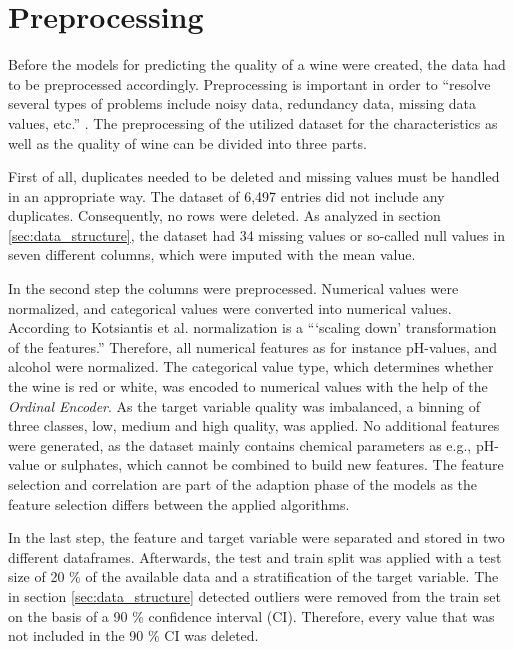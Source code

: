 \section{Preprocessing}\label{chap:preprocessing}
Before the models for predicting the quality of a wine were created, the data had to be preprocessed accordingly. Preprocessing is important in order to \enquote{resolve several types of problems include noisy data, redundancy data, missing data values, etc.} \citep[p. 116]{Kotsiantis2006}. The preprocessing of the utilized dataset for the characteristics as well as the quality of wine can be divided into three parts.

First of all, duplicates needed to be deleted and missing values must be handled in an appropriate way. The dataset of 6,497 entries did not include any duplicates. Consequently, no rows were deleted. As analyzed in section \ref{sec:data_structure}, the dataset had 34 missing values or so-called null values in seven different columns, which were imputed with the mean value.

In the second step the columns were preprocessed. Numerical values were normalized, and categorical values were converted into numerical values. According to Kotsiantis et al. normalization is a \enquote{\enquote{scaling down} transformation of the features.} \citep[p. 113]{Kotsiantis2006} Therefore, all numerical features as for instance pH-values, and alcohol were normalized. The categorical value type, which determines whether the wine is red or white, was encoded to numerical values with the help of the \textit{Ordinal Encoder}. \citep{OrdinalEncoder2021} As the target variable quality was imbalanced, a binning of three classes, low, medium and high quality, was applied. No additional features were generated, as the dataset mainly contains chemical parameters as e.g., pH-value or sulphates, which cannot be combined to build new features. The feature selection and correlation are part of the adaption phase of the models as the feature selection differs between the applied algorithms.

In the last step, the feature and target variable were separated and stored in two different dataframes. Afterwards, the test and train split was applied with a test size of 20 \% of the available data and a stratification of the target variable. The in section \ref{sec:data_structure} detected outliers were removed from the train set on the basis of a 90 \% confidence interval (CI). \citep{AskPython2021} Therefore, every value that was not included in the 90 \% CI was deleted.



